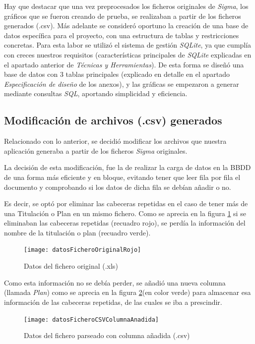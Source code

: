Hay que destacar que una vez preprocesados los ficheros originales de \emph{Sigma}, los gráficos que se fueron creando de prueba, se realizaban a partir de los ficheros generados (.csv). 
Más adelante se consideró oportuno la creación de una base de datos específica para el proyecto, con una estructura de tablas y restricciones concretas. Para esta labor se utilizó el sistema de gestión \emph{SQLite}, ya que cumplía con creces nuestros requisitos (características principales de \emph{SQLite} explicadas en el apartado anterior de \emph{Técnicas y Herramientas}).
De esta forma se diseñó una base de datos con 3 tablas principales (explicado en detalle en el apartado \emph{Especificación de diseño} de los anexos), y las gráficas se empezaron a generar mediante consultas \emph{SQL}, aportando simplicidad y eficiencia.

\subsection{Modificación de archivos (.csv) generados}

Relacionado con lo anterior, se decidió modificar los archivos que nuestra aplicación generaba a partir de los ficheros \emph{Sigma} originales. 

La decisión de esta modificación, fue la de realizar la carga de datos en la BBDD de una forma más eficiente y en bloque, evitando tener que leer fila por fila el documento y comprobando si los datos de dicha fila se debían añadir o no. 

Es decir, se optó por eliminar las cabeceras repetidas en el caso de tener más de una Titulación o Plan en un mismo fichero. Como se aprecia en la figura \ref{fig:datosFicheroOriginalRojo} si se eliminaban las cabeceras repetidas (recuadro rojo), se perdía la información del nombre de la titulación o plan (recuadro verde).

\begin{figure}%
	\centering
	\texttt{[image: datosFicheroOriginalRojo]}
	\caption{Datos del fichero original (.xls)}\label{fig:datosFicheroOriginalRojo}
\end{figure}


Como esta información no se debía perder, se añadió una nueva columna (llamada \emph{Plan}) como se aprecia en la figura \ref{fig:datosFicheroCSVColumnaAnadida}(en color verde) para almacenar esa información de las cabeceras repetidas, de las cuales se iba a prescindir.

\begin{figure}%
	\centering
	\texttt{[image: datosFicheroCSVColumnaAnadida]}
	\caption{Datos del fichero parseado con columna añadida (.csv)}\label{fig:datosFicheroCSVColumnaAnadida}
\end{figure}

